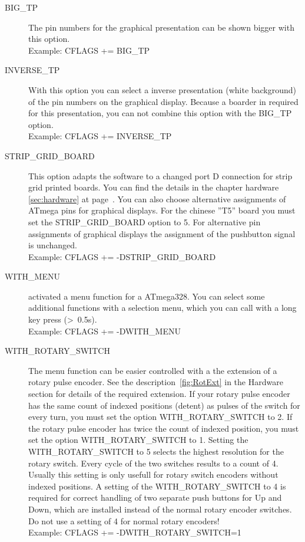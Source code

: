 \begin{description}
 \item[BIG\_TP] The pin numbers for the graphical presentation can be shown bigger with this option.\\
Example: CFLAGS += BIG\_TP

 \item[INVERSE\_TP] With this option you can select a inverse presentation (white background) of the pin numbers
on the graphical display.
Because a boarder in required for this presentation, you can not combine this option with the BIG\_TP option.\\
Example: CFLAGS += INVERSE\_TP

  \item[STRIP\_GRID\_BOARD] This option adapts the software to a changed port D connection for strip grid printed boards.
You can find the details in the chapter hardware \ref{sec:hardware} at page~\pageref{sec:hardware}.
You can also choose alternative assignments of ATmega pins for graphical displays.
For the chinese ''T5'' board you must set the STRIP\_GRID\_BOARD option to 5.
For alternative pin assignments of graphical displays the assignment of the pushbutton signal is unchanged.\\
Example: CFLAGS += -DSTRIP\_GRID\_BOARD

  \item[WITH\_MENU] activated a menu function for a ATmega328. You can select some additional functions with a
selection menu, which you can call with a long key press (\textgreater~0.5s).\\
Example: CFLAGS += -DWITH\_MENU

  \item[WITH\_ROTARY\_SWITCH] The menu function can be easier controlled with a the extension of a rotary pulse encoder.
See the description~\ref{fig:RotExt} in the Hardware section for details of the required extension.
If your rotary pulse encoder has the same count of indexed positions (detent) as pulses of the switch for every turn, you must
set the  option WITH\_ROTARY\_SWITCH to 2. If the rotary pulse encoder has twice the count of indexed position, you must
set the option WITH\_ROTARY\_SWITCH to 1.
Setting the WITH\_ROTARY\_SWITCH to 5 selects the highest resolution for the rotary switch. Every cycle of the two switches results
to a count of 4. Usually this setting is only usefull for rotary switch encoders without indexed positions.
A setting of the WITH\_ROTARY\_SWITCH to 4 is required for correct handling of two separate push buttons for Up and Down,
which are installed instead of the normal rotary encoder switches.
Do not use a setting of 4 for normal rotary encoders!\\
Example: CFLAGS += -DWITH\_ROTARY\_SWITCH=1


\end{description}

